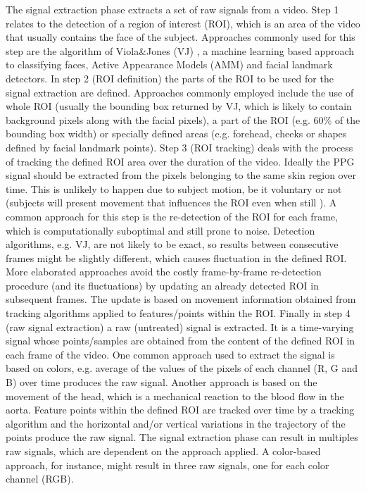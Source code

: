 The signal extraction phase extracts a set of raw signals from a video. Step 1 relates to the detection of a region of interest (ROI), which is an area of the video that usually contains the face of the subject. Approaches commonly used for this step are the algorithm of Viola\&Jones (VJ) \parencite{ViolaJones}, a machine learning based approach to classifying faces, Active Appearance Models (AMM) \parencite{EdwardsAAM} and facial landmark detectors. %
In step 2 (ROI definition) the parts of the ROI to be used for the signal extraction are defined. Approaches commonly employed include the use of whole ROI (usually the bounding box returned by VJ, which is likely to contain background pixels along with the facial pixels), a part of the ROI (e.g. 60\% of the bounding box width) or specially defined areas (e.g. forehead, cheeks or shapes defined by facial landmark points). Step 3 (ROI tracking) deals with the process of tracking the defined ROI area over the duration of the video. Ideally the PPG signal should be extracted from the pixels belonging to the same skin region over time. This is unlikely to happen due to subject motion, be it voluntary or not (subjects will present movement that influences the ROI even when still \parencite{poh2010non}). A common approach for this step is the re-detection of the ROI for each frame, which is computationally suboptimal and still prone to noise. Detection algorithms, e.g. VJ, are not likely to be exact, so results between consecutive frames might be slightly different, which causes fluctuation in the defined ROI. More elaborated approaches avoid the costly frame-by-frame re-detection procedure (and its fluctuations) by updating an already detected ROI in subsequent frames. The update is based on movement information obtained from tracking algorithms applied to features/points within the ROI. %
Finally in step 4 (raw signal extraction) a raw (untreated) signal is extracted. It is a time-varying signal whose points/samples are obtained from the content of the defined ROI in each frame of the video. One common approach used to extract the signal is based on colors, e.g. average of the values of the pixels of each channel (R, G and B) over time produces the raw signal. Another approach is based on the movement of the head, which is a mechanical reaction to the blood flow in the aorta. Feature points within the defined ROI are tracked over time by a tracking algorithm and the horizontal and/or vertical variations in the trajectory of the points produce the raw signal. The signal extraction phase can result in multiples raw signals, which are dependent on the approach applied. A color-based approach, for instance, might result in three raw signals, one for each color channel (RGB).

